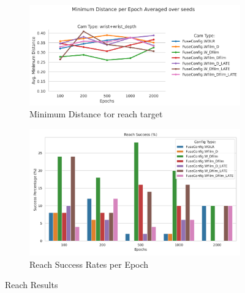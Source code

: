 \begin{figure}[htpb]
  \centering
  \begin{subfigure}{0.40\linewidth}
    \centering
    \includegraphics[width=\linewidth]{assets/evaluation/film/reach-min-cams.png}
    \caption{Minimum Distance tor reach target}\label{subfig:film-reach-min}
  \end{subfigure}
  \begin{subfigure}{0.40\linewidth}
    \centering
    \includegraphics[width=\linewidth]{assets/evaluation/film/base-reach-success-config-epochs.png}
    \caption{Reach Success Rates per Epoch}\label{subfig:film-reach-success}
  \end{subfigure}
  \caption{Reach Results}\label{fig:film-reach}
\end{figure}

